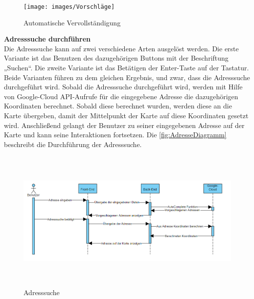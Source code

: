 \begin{figure}[h]
	\centering
	\texttt{[image: images/Vorschläge]}
	\caption{Automatische Vervollständigung}
	\label{fig:Automatische Vervollständigung}
\end{figure}

\newpage
\textbf{Adresssuche durchführen} \\
Die Adresssuche kann auf zwei verschiedene Arten ausgelöst werden.
Die erste Variante ist das Benutzen des dazugehörigen Buttons mit der Beschriftung „Suchen“. Die zweite Variante ist das Betätigen der Enter-Taste auf der Tastatur. Beide Varianten führen zu dem gleichen Ergebnis, und zwar, dass die Adresssuche durchgeführt wird.
Sobald die Adresssuche durchgeführt wird, werden mit Hilfe von Google-Cloud API-Aufrufe für die eingegebene Adresse die dazugehörigen Koordinaten berechnet. Sobald diese berechnet wurden, werden diese an die Karte übergeben, damit der Mittelpunkt der Karte auf diese Koordinaten gesetzt wird. Anschließend gelangt der Benutzer zu seiner eingegebenen Adresse auf der Karte und kann seine Interaktionen fortsetzen. Die \autoref{fig:AdresseDiagramm} beschreibt die Durchführung der Adresssuche.
\begin{figure}[h]
	\centering
	\includegraphics[height=7cm,width=17cm]{images/Adresssuche}
	\caption{Adresssuche}
	\label{fig:AdresseDiagramm}
\end{figure}



\newpage
